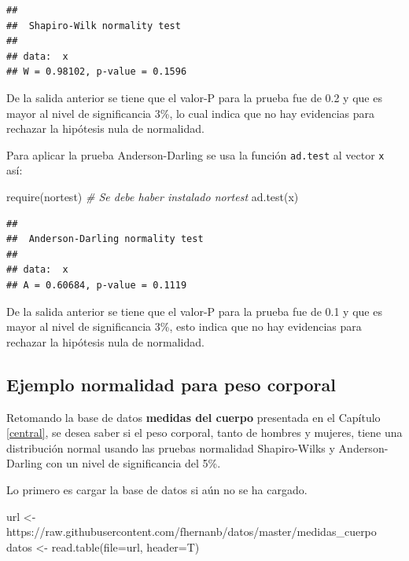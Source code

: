 \documentclass[
]{book}
\makeatletter
\newenvironment{Shaded}{\begin{snugshade}}{\end{snugshade}}
\newcommand{\AttributeTok}[1]{\textcolor[rgb]{0.77,0.63,0.00}{#1}}
\newcommand{\CommentTok}[1]{\textcolor[rgb]{0.56,0.35,0.01}{\textit{#1}}}
\newcommand{\FunctionTok}[1]{\textcolor[rgb]{0.00,0.00,0.00}{#1}}
\newcommand{\NormalTok}[1]{#1}
\newcommand{\OtherTok}[1]{\textcolor[rgb]{0.56,0.35,0.01}{#1}}
\newcommand{\StringTok}[1]{\textcolor[rgb]{0.31,0.60,0.02}{#1}}
\newenvironment{kframe}{%
\medskip{}
\setlength{\fboxsep}{.8em}
 \def\at@end@of@kframe{}%
 \ifinner\ifhmode%
  \def\at@end@of@kframe{\end{minipage}}%
  \begin{minipage}{\columnwidth}%
 \fi\fi%
 \def\FrameCommand##1{\hskip\@totalleftmargin \hskip-\fboxsep
 \colorbox{shadecolor}{##1}\hskip-\fboxsep
     \hskip-\linewidth \hskip-\@totalleftmargin \hskip\columnwidth}%
 \MakeFramed {\advance\hsize-\width
   \@totalleftmargin\z@ \linewidth\hsize
   \@setminipage}}%
 {\par\unskip\endMakeFramed%
 \at@end@of@kframe}
\renewenvironment{Shaded}{\begin{kframe}}{\end{kframe}}
\makeatother
\begin{document}
\begin{verbatim}
## 
##  Shapiro-Wilk normality test
## 
## data:  x
## W = 0.98102, p-value = 0.1596
\end{verbatim}

De la salida anterior se tiene que el valor-P para la prueba fue de 0.2 y que es mayor al nivel de significancia 3\%, lo cual indica que no hay evidencias para rechazar la hipótesis nula de normalidad.

Para aplicar la prueba Anderson-Darling se usa la función \texttt{ad.test} al vector \texttt{x} así:

\begin{Shaded}
\begin{Highlighting}[]
\FunctionTok{require}\NormalTok{(nortest)  }\CommentTok{\# Se debe haber instalado nortest}
\FunctionTok{ad.test}\NormalTok{(x)}
\end{Highlighting}
\end{Shaded}

\begin{verbatim}
## 
##  Anderson-Darling normality test
## 
## data:  x
## A = 0.60684, p-value = 0.1119
\end{verbatim}

De la salida anterior se tiene que el valor-P para la prueba fue de 0.1 y que es mayor al nivel de significancia 3\%, esto indica que no hay evidencias para rechazar la hipótesis nula de normalidad.

\hypertarget{ejemplo-normalidad-para-peso-corporal}{%
\subsection*{Ejemplo normalidad para peso corporal}\label{ejemplo-normalidad-para-peso-corporal}}

Retomando la base de datos \textbf{medidas del cuerpo} presentada en el Capítulo \ref{central}, se desea saber si el peso corporal, tanto de hombres y mujeres, tiene una distribución normal usando las pruebas normalidad Shapiro-Wilks y Anderson-Darling con un nivel de significancia del 5\%.

Lo primero es cargar la base de datos si aún no se ha cargado.

\begin{Shaded}
\begin{Highlighting}[]
\NormalTok{url }\OtherTok{\textless{}{-}} \StringTok{\textquotesingle{}https://raw.githubusercontent.com/fhernanb/datos/master/medidas\_cuerpo\textquotesingle{}}
\NormalTok{datos }\OtherTok{\textless{}{-}} \FunctionTok{read.table}\NormalTok{(}\AttributeTok{file=}\NormalTok{url, }\AttributeTok{header=}\NormalTok{T)}
\end{Highlighting}
\end{Shaded}
\end{document}

